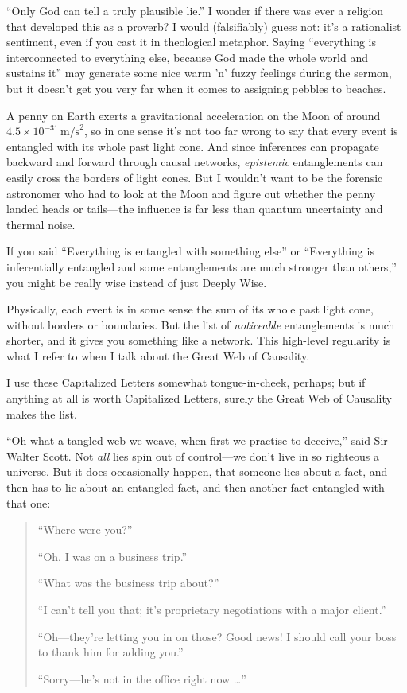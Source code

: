 {
 ``Only God can tell a truly plausible
lie.'' I wonder if there was ever a religion that
developed this as a proverb? I would (falsifiably) guess not:
it's a rationalist sentiment, even if you cast it in
theological metaphor. Saying ``everything is
interconnected to everything else, because God made the whole world and
sustains it'' may generate some nice warm
'n' fuzzy feelings during the sermon,
but it doesn't get you very far when it comes to
assigning pebbles to beaches.}

{
 A penny on Earth exerts a gravitational acceleration on the Moon
of around $4.5 \times 10^{-31}\,
\mathrm{m/s}^{2}$, so in one sense it's not too
far wrong to say that every event is entangled with its whole past
light cone. And since inferences can propagate backward and forward
through causal networks, \textit{epistemic} entanglements can easily
cross the borders of light cones. But I wouldn't want
to be the forensic astronomer who had to look at the Moon and figure
out whether the penny landed heads or tails---the influence is far less
than quantum uncertainty and thermal noise.}

{
 If you said ``Everything is entangled with
something else'' or ``Everything is
inferentially entangled and some entanglements are much stronger than
others,'' you might be really wise instead of just
Deeply Wise.}

{
 Physically, each event is in some sense the sum of its whole past
light cone, without borders or boundaries. But the list of
\textit{noticeable} entanglements is much shorter, and it gives you
something like a network. This high-level regularity is what I refer to
when I talk about the Great Web of Causality.}

{
 I use these Capitalized Letters somewhat tongue-in-cheek, perhaps;
but if anything at all is worth Capitalized Letters, surely the Great
Web of Causality makes the list.}

{
 ``Oh what a tangled web we weave, when first we
practise to deceive,'' said Sir Walter Scott. Not
\textit{all} lies spin out of control---we don't live
in so righteous a universe. But it does occasionally happen, that
someone lies about a fact, and then has to lie about an entangled fact,
and then another fact entangled with that one:}

\begin{quote}
{
 ``Where were you?''}

{
 ``Oh, I was on a business
trip.''}

{
 ``What was the business trip
about?''}

{
 ``I can't tell you that;
it's proprietary negotiations with a major
client.''}

{
 ``Oh---they're letting you in on
those? Good news! I should call your boss to thank him for adding
you.''}

{
 ``Sorry---he's not in the office
  right now \ldots''}
\end{quote}

